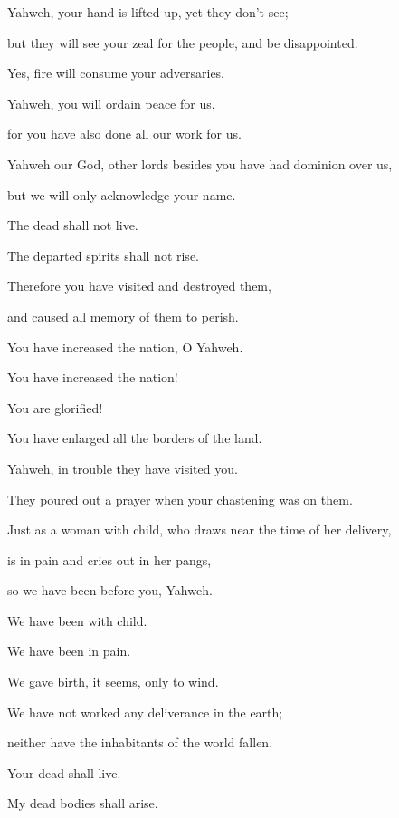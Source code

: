 {\par }{\BB \par }{\Q {}Yahweh, your hand is lifted up, yet they don’t see;
\par }{\QB but they will see your zeal for the people, and be disappointed.
\par }{\QB Yes, fire will consume your adversaries.
\par }{\Q {}Yahweh, you will ordain peace for us,
\par }{\QB for you have also done all our work for us.
\par }{\Q {}Yahweh our God, other lords besides you have had dominion over us,
\par }{\QB but we will only acknowledge your name.
\par }{\Q {}The dead shall not live.
\par }{\QB The departed spirits shall not rise.
\par }{\Q Therefore you have visited and destroyed them,
\par }{\QB and caused all memory of them to perish.
\par }{\Q {}You have increased the nation, O Yahweh.
\par }{\QB You have increased the nation!
\par }{\Q You are glorified!
\par }{\QB You have enlarged all the borders of the land.
\par }{\BB \par }{\Q {}Yahweh, in trouble they have visited you.
\par }{\QB They poured out a prayer when your chastening was on them.
\par }{\Q {}Just as a woman with child, who draws near the time of her delivery,
\par }{\QB is in pain and cries out in her pangs,
\par }{\QB so we have been before you, Yahweh.
\par }{\Q {}We have been with child.
\par }{\QB We have been in pain.
\par }{\Q We gave birth, it seems, only to wind.
\par }{\QB We have not worked any deliverance in the earth;
\par }{\QB neither have the inhabitants of the world fallen.
\par }{\Q {}Your dead shall live.
\par }{\QB My dead bodies shall arise.
}
